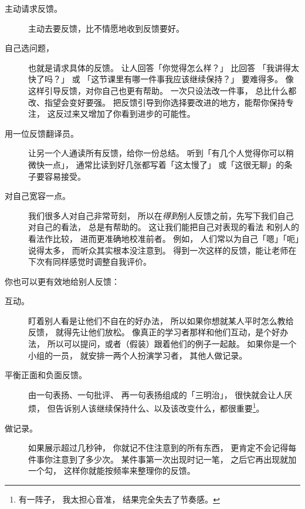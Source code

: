 \begin{description}

\item[主动请求反馈。]
  主动去要反馈，比不情愿地收到反馈要好。

\item[自己选问题，]
  也就是请求具体的反馈。
  让人回答「你觉得怎么样？」
  比回答
  「我讲得太快了吗？」
  或
  「这节课里有哪一件事我应该继续保持？」
  要难得多。
  像这样引导反馈，对你自己也更有帮助。
  一次只设法改一件事，
  总比什么都改、指望会变好要强。
  把反馈引导到你选择要改进的地方，能帮你保持专注，
  这反过来又增加了你看到进步的可能性。

\item[用一位反馈翻译员。]
  让另一个人通读所有反馈，给你一份总结。
  听到「有几个人觉得你可以稍微快一点」，
  通常比读到好几张都写着「这太慢了」
  或「这很无聊」的条子要容易接受。

\item[对自己宽容一点。]
  我们很多人对自己非常苛刻，
  所以在\emph{得到}别人反馈之前，先写下我们自己对自己的看法，
  总是有帮助的。
  这让我们能把自己对表现的看法
  和别人的看法作比较，
  进而更准确地校准前者。
  例如，
  人们常以为自己「嗯」「呃」说得太多，
  而听众其实根本没注意到。
  得到一次这样的反馈，能让老师在下次有同样感觉时调整自我评价。

\end{description}

\noindent
你也可以更有效地给别人反馈：

\begin{description}

\item[互动。]
  盯着别人看是让他们不自在的好办法，
  所以如果你想就某人平时怎么教给反馈，
  就得先让他们放松。
  像真正的学习者那样和他们互动，是个好办法，
  所以可以提问，或者（假装）跟着他们的例子一起敲。
  如果你是一个小组的一员，
  就安排一两个人扮演学习者，
  其他人做记录。

\item[平衡正面和负面反馈。]
  由一句表扬、一句批评、
  再一句表扬组成的「三明治」，
  很快就会让人厌烦，
  但告诉别人该继续保持什么、以及该改变什么，都很重要\footnote{
    有一阵子，
    我太担心音准，
    结果完全失去了节奏感。
  }。

\item[做记录。]
  如果展示超过几秒钟，
  你就记不住注意到的所有东西，
  更肯定不会记得每件事你注意到了多少次。
  某件事第一次出现时记一笔，
  之后它再出现就加一个勾，
  这样你就能按频率来整理你的反馈。

\end{description}

